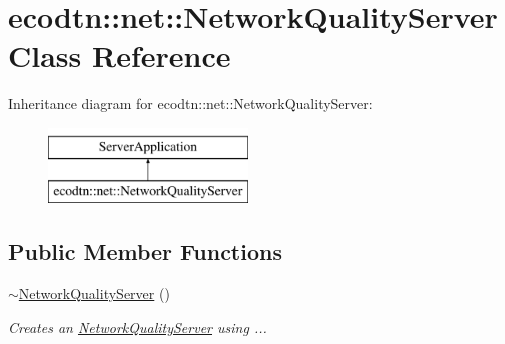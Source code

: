 \hypertarget{classecodtn_1_1net_1_1NetworkQualityServer}{}\section{ecodtn\+:\+:net\+:\+:Network\+Quality\+Server Class Reference}
\label{classecodtn_1_1net_1_1NetworkQualityServer}
Inheritance diagram for ecodtn\+:\+:net\+:\+:Network\+Quality\+Server\+:\begin{figure}[H]
\begin{center}
\leavevmode
\includegraphics[height=2.000000cm]{classecodtn_1_1net_1_1NetworkQualityServer}
\end{center}
\end{figure}
\subsection*{Public Member Functions}
\begin{DoxyCompactItemize}
\item 
\mbox{\label{classecodtn_1_1net_1_1NetworkQualityServer_a094f1efb8dcbede98d78c1388e1adaf0}} 
\hyperlink{classecodtn_1_1net_1_1NetworkQualityServer_a094f1efb8dcbede98d78c1388e1adaf0}{$\sim$\+Network\+Quality\+Server} ()
\begin{DoxyCompactList}\small\item\em Creates an \hyperlink{classecodtn_1_1net_1_1NetworkQualityServer}{Network\+Quality\+Server} using ... \end{DoxyCompactList}\end{DoxyCompactItemize}

